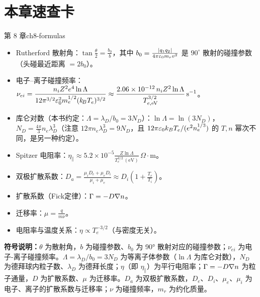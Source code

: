 \section*{本章速查卡}
{}
\begin{formulabox}{第 8 章}{ch8-formulas}
\begin{itemize}[leftmargin=*,itemsep=0pt]
\item Rutherford 散射角：$\displaystyle\tan\frac{\theta}{2} = \frac{b_0}{b}$，其中 $b_0 = \frac{|q_1 q_2|}{4\pi\varepsilon_0 m_r v^2}$ 是 $90^\circ$ 散射的碰撞参数（头碰最近距离 $=2b_0$）。
\item 电子--离子碰撞频率：$\displaystyle\nu_{ei} = \frac{n_i Z^2 e^4 \ln\Lambda}{12\pi^{3/2}\varepsilon_0^2 m_e^{1/2}(k_{\!B}T_e)^{3/2}} \approx \frac{2.06\times10^{-12}\,n_iZ^2\ln\Lambda}{T_{e,\mathrm{eV}}^{3/2}}\,\mathrm{s^{-1}}$。
\item 库仑对数（本书约定：$\Lambda=\lambda_D/b_0=3N_D$）：$\displaystyle\ln\Lambda = \ln(3N_D)$，$N_D = \tfrac{4\pi}{3}n_e\lambda_D^3$（注意 $12\pi n_e\lambda_D^3=9N_D$，且 $12\pi\varepsilon_0 k_BT_e/(e^2n_e^{1/3})$ 的 $T,n$ 幂次不同，是另一种约定）。
\item Spitzer 电阻率：$\displaystyle\eta_{\parallel} \approx 5.2\times 10^{-5}\frac{Z\ln\Lambda}{T_e^{3/2}\,\mathrm{(eV)}}\,\Omega\cdot\mathrm{m}$。
\item 双极扩散系数：$\displaystyle D_a = \frac{\mu_i D_e + \mu_e D_i}{\mu_i + \mu_e} \approx D_i\left(1 + \frac{T_e}{T_i}\right)$。
\item 扩散系数（Fick定律）：$\displaystyle\Gamma = -D\nabla n$。
\item 迁移率：$\displaystyle\mu = \frac{q}{m\nu}$。
\item 电阻率与温度关系：$\displaystyle\eta \propto T_e^{-3/2}$（与密度无关）。
\end{itemize}
\textbf{符号说明：}$\theta$ 为散射角，$b$ 为碰撞参数、$b_0$ 为 90° 散射对应的碰撞参数；$\nu_{ei}$ 为电子-离子碰撞频率。$\Lambda=\lambda_D/b_0=3N_D$ 为等离子体参数（$\ln\Lambda$ 为库仑对数），$N_D$ 为德拜球内粒子数、$\lambda_D$ 为德拜长度；$\eta$（即 $\eta_\parallel$）为平行电阻率；$\Gamma=-D\nabla n$ 为粒子通量，$D$ 为扩散系数、$\mu$ 为迁移率。$D_a$ 为双极扩散系数，$D_e$、$D_i$、$\mu_e$、$\mu_i$ 为电子、离子的扩散系数与迁移率；$\nu$ 为碰撞频率，$m_r$ 为约化质量。
\end{formulabox}

